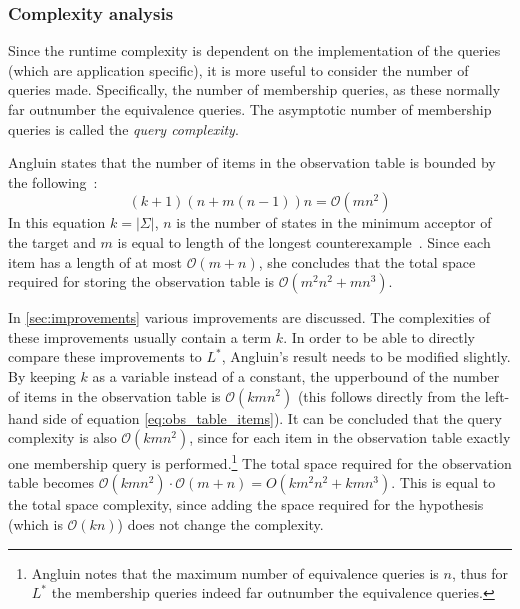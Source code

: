 \subsubsection{Complexity analysis}
\label{sec:complexity-analysis-lstar}

Since the runtime complexity is dependent on the implementation of the queries
(which are application specific), it is more useful to consider the number of
queries made. Specifically, the number of membership queries, as these normally
far outnumber the equivalence queries. The asymptotic number of membership
queries is called the \textit{query complexity}.

Angluin states that the number of items in the observation table is bounded by
the following~\cite{Angluin1987}:
\begin{equation} \label{eq:obs_table_items}
(k+1)(n+m(n-1))n = \mathcal{O}(mn^2)
\end{equation}
In this equation $k = |\Sigma|$, $n$ is the number of states in the minimum
acceptor of the target and $m$ is equal to length of the longest
counterexample~\cite{Angluin1987}. Since each item has a length of at most
$\mathcal{O}(m+n)$, she concludes that the total space required for storing the
observation table is $\mathcal{O}(m^2n^2 + mn^3)$.

In \cref{sec:improvements} various improvements are discussed. The complexities
of these improvements usually contain a term $k$. In order to be able to
directly compare these improvements to $L^*$, Angluin's result needs to be
modified slightly. By keeping $k$ as a variable instead of a constant, the
upperbound of the number of items in the observation table is
$\mathcal{O}(kmn^2)$ (this follows directly from the left-hand side of equation
\ref{eq:obs_table_items}). It can be concluded that the query complexity is also
$\mathcal{O}(kmn^2)$, since for each item in the observation table exactly one
membership query is performed.\footnote{Angluin notes that the maximum number of
equivalence queries is $n$, thus for $L^*$ the membership queries indeed far
outnumber the equivalence queries.} The total space required for the observation
table becomes $\mathcal{O}(kmn^2) \cdot \mathcal{O}(m+n) = O(km^2n^2 + kmn^3)$.
This is equal to the total space complexity, since adding the space required for
the hypothesis (which is $\mathcal{O}(kn)$) does not change the complexity.

